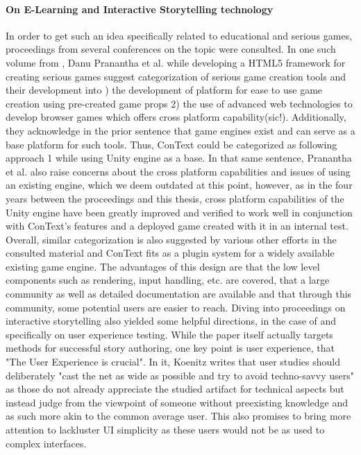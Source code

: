 \paragraph{On E-Learning and Interactive Storytelling technology}
In order to get such an idea specifically related to educational and serious games, proceedings from several conferences on the topic were consulted. In one such volume from \cite{ELEARN}, Danu Pranantha et al. while developing a HTML5 framework for creating serious games suggest categorization of serious game creation tools and their development into ) the development of platform for ease to use game creation using pre-created game props 2) the use of advanced web technologies to develop browser games which offers cross platform capability\grqq (sic!)\cite{ELEARN1}. Additionally, they acknowledge in the prior sentence that game engines exist and can serve as a base platform for such tools. Thus, ConText could be categorized as following approach 1 while using Unity engine as a base. In that same sentence, Pranantha et al. also raise concerns about the cross platform capabilities and issues of using an existing engine, which we deem outdated at this point, however, as in the four years between the proceedings and this thesis, cross platform capabilities of the Unity engine have been greatly improved and verified to work well in conjunction with ConText's features and a deployed game created with it in an internal test. Overall, similar categorization is also suggested by various other efforts in the consulted material and ConText fits as a plugin system for a widely available existing game engine. The advantages of this design are that the low level components such as rendering, input handling, etc. are covered, that a large community as well as detailed documentation are available and that through this community, some potential users are easier to reach. 
Diving into proceedings on interactive storytelling also yielded some helpful directions, in the case of \cite{ISTORY} and \cite{ISTORY1} specifically on user experience testing. While the paper itself actually targets methods for successful story authoring, one key point is user experience, that "The User Experience is crucial". In it, Koenitz writes that user studies should deliberately "cast the net as wide as possible and try to avoid techno-savvy users"\cite[p.~135]{ISTORY} as those do not already appreciate the studied artifact for technical aspects but instead judge from the viewpoint of someone without preexisting knowledge and as such more akin to the common average user. This also promises to bring more attention to lackluster UI simplicity as these users would not be as used to complex interfaces.

